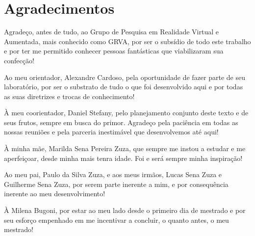 \newpage
\thispagestyle{empty}
\chapter*{Agradecimentos}

Agradeço, antes de tudo, ao Grupo de Pesquisa em Realidade Virtual e Aumentada, mais conhecido como GRVA, por ser o subsídio de todo este trabalho e por ter me permitido conhecer pessoas fantásticas que viabilizaram sua confecção!

Ao meu orientador, Alexandre Cardoso, pela oportunidade de fazer parte de seu laboratório, por ser o substrato de tudo o que foi desenvolvido aqui e por todas as suas diretrizes e trocas de conhecimento!

À meu coorientador, Daniel Stefany, pelo planejamento conjunto deste texto e de seus frutos, sempre em busca do primor. Agradeço pela paciência em todas as nossas reuniões e pela parceria inestimável que desenvolvemos até aqui!
 
 À minha mãe, Marilda Sena Pereira Zuza, que sempre me instou a estudar e me aperfeiçoar, desde minha mais tenra idade. Foi e será sempre minha inspiração!
 
 Ao meu pai, Paulo da Silva Zuza, e aos meus irmãos, Lucas Sena Zuza e Guilherme Sena Zuza, por serem parte inerente a mim, e por consequência inerente ao meu desenvolvimento!
 
 À Milena Bugoni, por estar ao meu lado desde o primeiro dia de mestrado e por seu esforço empenhado em me incentivar a concluir, o quanto antes, o meu mestrado!
 

